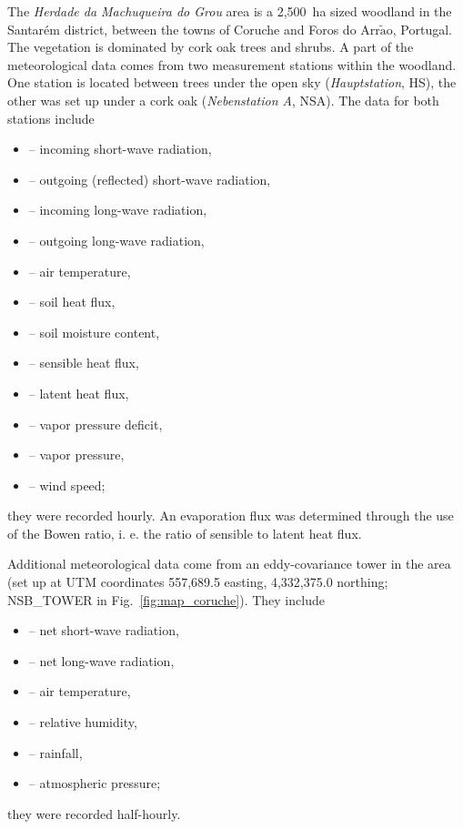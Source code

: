 \documentclass{scrreprt}
\newenvironment{denseitem}{
  \begin{itemize}
    \setlength{\itemsep}{0pt}
    \setlength{\parskip}{0pt}
    \setlength{\parsep}{0pt}
}{
  \end{itemize}
}
\begin{document}
The \emph{Herdade da Machuqueira do Grou} area is a 2,500~ha sized woodland in the Santar\'em district, between the towns of Coruche and Foros do Arr$\tilde{\text{a}}$o, Portugal.
The vegetation is dominated by cork oak trees and shrubs.
A part of the meteorological data comes from two measurement stations within the woodland.
One station is located between trees under the open sky (\emph{Hauptstation}, HS), the other was set up under a cork oak (\emph{Nebenstation A}, NSA).
The data for both stations include
\begin{denseitem}
  \item[--] incoming short-wave radiation,
  \item[--] outgoing (reflected) short-wave radiation,
  \item[--] incoming long-wave radiation,
  \item[--] outgoing long-wave radiation,
  \item[--] air temperature,
  \item[--] soil heat flux,
  \item[--] soil moisture content,
  \item[--] sensible heat flux,
  \item[--] latent heat flux,
  \item[--] vapor pressure deficit,
  \item[--] vapor pressure,
  \item[--] wind speed;
\end{denseitem}
%
they were recorded hourly.
An evaporation flux was determined through the use of the Bowen ratio, i. e. the ratio of sensible to latent heat flux.

Additional meteorological data come from an eddy-covariance tower in the area (set up at UTM coordinates 557,689.5 easting, 4,332,375.0 northing; NSB\_TOWER in Fig.~\ref{fig:map_coruche}).
They include
\begin{denseitem}
  \item[--] net short-wave radiation,
  \item[--] net long-wave radiation,
  \item[--] air temperature,
  \item[--] relative humidity,
  \item[--] rainfall,
  \item[--] atmospheric pressure;
\end{denseitem}
%
they were recorded half-hourly.
\end{document}
